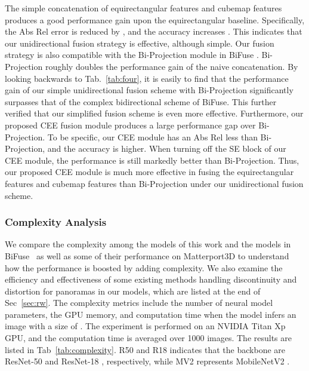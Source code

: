 \documentclass[letterpaper, 10 pt, conference]{ieeeconf}
\begin{document}
The simple concatenation of equirectangular features and cubemap features produces a good performance gain upon the equirectangular baseline. Specifically, the Abs Rel error is reduced by , and the   accuracy increases . 
This indicates that our unidirectional fusion strategy is effective, although simple. 
Our fusion strategy is also compatible with the Bi-Projection module in BiFuse \cite{wang2020bifuse}. Bi-Projection roughly doubles the performance gain of the naive concatenation. 
By looking backwards to Tab.~\ref{tab:four}, it is easily to find that the performance gain of our simple unidirectional fusion scheme with Bi-Projection significantly surpasses that of the complex bidirectional scheme of BiFuse. This further verified that our simplified fusion scheme is even more effective. 
Furthermore, our proposed CEE fusion module produces a large performance gap over Bi-Projection. To be specific, our CEE module has an Abs Rel  less than Bi-Projection, and the accuracy  is  higher. When turning off the SE block of our CEE module, the performance is still markedly better than Bi-Projection. Thus, our proposed CEE module is much more effective in fusing the equirectangular features and cubemap features than Bi-Projection under our unidirectional fusion scheme. 


\subsubsection{Complexity Analysis}
\label{sec:ca}
We compare the complexity among the models of this work and the models in BiFuse~\cite{wang2020bifuse} as well as some of their performance on Matterport3D to understand how the performance is boosted by adding complexity. 
{We also examine the efficiency and effectiveness of some existing methods handling discontinuity and distortion for panoramas in our models, which are listed at the end of Sec~\ref{sec:rw}. }
The complexity metrics include the number of {neural} model parameters, the GPU memory, and computation time when the model infers an image with a size of .
The experiment is performed on {an NVIDIA Titan Xp GPU}, and the computation time is averaged over 1000 images. {The results are listed in Tab~\ref{tab:complexity}.} R50 and R18 indicates that the backbone are ResNet-50 and ResNet-18 \cite{he2016deep}, respectively, while MV2 represents MobileNetV2 \cite{sandler2018mobilenetv2}. 
\end{document}
